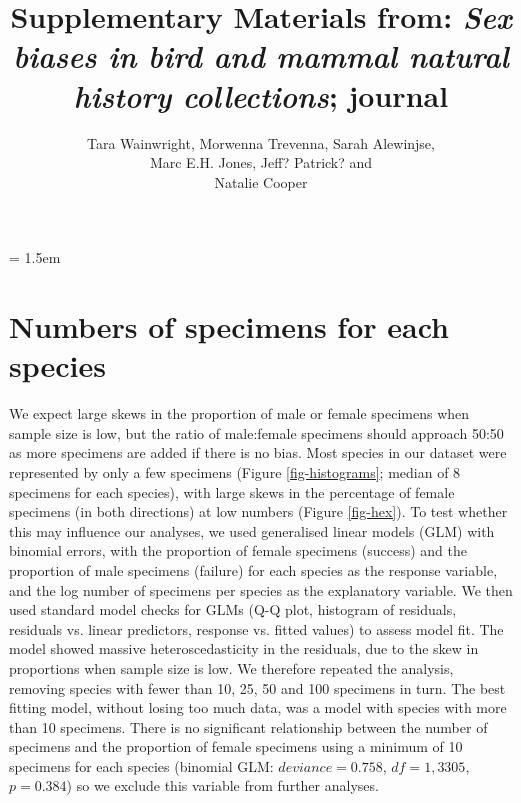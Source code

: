 \documentclass[a4paper, 12pt]{article}
\title{Supplementary Materials from: \textit{Sex biases in bird and mammal natural history collections}; journal}
\author{Tara Wainwright, 
  Morwenna Trevenna, 
  Sarah Alewinjse,\\ 
  Marc E.H. Jones, 
  Jeff? 
  Patrick? and\\
  Natalie Cooper}
\date{}
\begin{document}
\maketitle

\tableofcontents

\parindent = 1.5em
\addtolength{\parskip}{.3em}


\newpage
\section{Numbers of specimens for each species}

We expect large skews in the proportion of male or female specimens when sample size is low, but the ratio of male:female specimens should approach 50:50 as more specimens are added if there is no bias. 
Most species in our dataset were represented by only a few specimens (Figure \ref{fig-histograms}; median of 8 specimens for each species), with large skews in the percentage of female specimens (in both directions) at low numbers (Figure \ref{fig-hex}).
To test whether this may influence our analyses, we used generalised linear models (GLM) with binomial errors, with the proportion of female specimens (success) and the proportion of male specimens (failure) for each species as the response variable, and the log number of specimens per species as the explanatory variable. 
We then used standard model checks for GLMs (Q-Q plot, histogram of residuals, residuals vs. linear predictors, response vs. fitted values) to assess model fit. 
The model showed massive heteroscedasticity in the residuals, due to the skew in proportions when sample size is low. 
We therefore repeated the analysis, removing species with fewer than 10, 25, 50 and 100 specimens in turn. 
The best fitting model, without losing too much data, was a model with species with more than 10 specimens. 
There is no significant relationship between the number of specimens and the proportion of female specimens using a minimum of 10 specimens for each species (binomial GLM: $deviance = 0.758$, $df = 1,3305$, $p = 0.384$) so we exclude this variable from further analyses.
\end{document}
